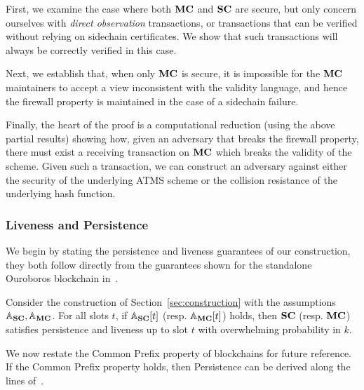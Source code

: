 First, we examine the case where both $\mathbf{MC}$ and $\mathbf{SC}$ are secure, but only
concern ourselves with \emph{direct observation} transactions, or transactions
that can be verified without relying on sidechain certificates.
We show that such
transactions will always be correctly verified
in this case.

Next, we establish that, when only $\mathbf{MC}$ is secure, it is impossible for the
$\mathbf{MC}$ maintainers to accept a view inconsistent with the validity language, and
hence the firewall property is maintained in the case of a sidechain failure.

Finally, the heart of the proof is a computational reduction (using the above
partial results) showing how, given
an adversary that breaks the firewall property,
there must exist a receiving transaction on $\mathbf{MC}$
which breaks the validity of the scheme. Given such a transaction, we can
construct an adversary against either the security of the underlying ATMS scheme or the
collision resistance of the underlying hash function.

\subsubsection{Liveness and Persistence}

We begin by stating the persistence and liveness guarantees of our
construction, they both follow directly from the guarantees shown for the
standalone Ouroboros blockchain in~\cite{ouroboros}.

\begin{lemma}\label{lem:perslive}
  Consider the construction of Section~\ref{sec:construction} with
  the assumptions $\mathbb{A}_{\mathbf{SC}}, \mathbb{A}_{\mathbf{MC}}$. For all slots $t$, if
  $\mathbb{A}_{\mathbf{SC}}[t]$ (resp. $\mathbb{A}_{\mathbf{MC}}[t]$) holds, then $\mathbf{SC}$ (resp. $\mathbf{MC}$)
  satisfies persistence and liveness up to slot $t$ with overwhelming probability in $k$.
\end{lemma}

We now restate the Common Prefix property of blockchains for future reference.
If the Common Prefix property holds, then Persistence can be derived along the
lines of~\cite{ouroboros}.

